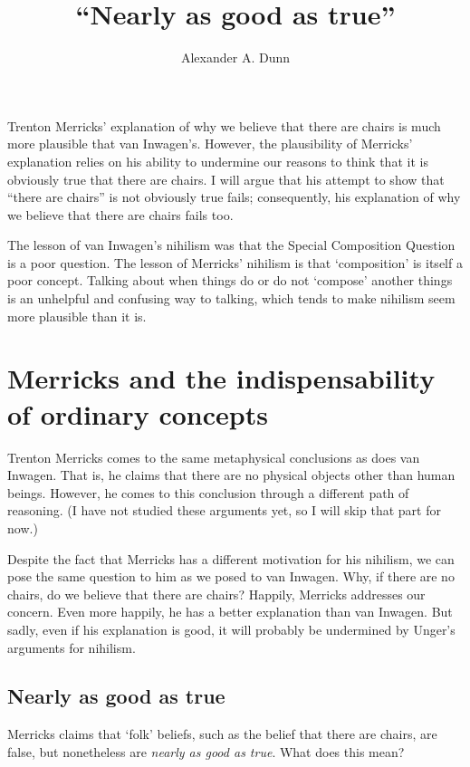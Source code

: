\documentclass[11pt]{article}
\title{``Nearly as good as true''}
\author{Alexander A. Dunn}
\begin{document}
\ifstandalone
\maketitle
\begin{spacing}{1.25}
\fi

\noindent Trenton Merricks' explanation of why we believe that there
are chairs is much more plausible that van Inwagen's.  However, the
plausibility of Merricks' explanation relies on his ability to
undermine our reasons to think that it is obviously true that there
are chairs.  I will argue that his attempt to show that ``there are
chairs'' is not obviously true fails; consequently, his explanation of
why we believe that there are chairs fails too.  

The lesson of van Inwagen's nihilism was that the Special Composition
Question is a poor question.  The lesson of Merricks' nihilism is that
`composition' is itself a poor concept.  Talking about when things do
or do not `compose' another things is an unhelpful and confusing way
to talking, which tends to make nihilism seem more plausible than it
is.

\section{Merricks and the indispensability of ordinary concepts}
\label{merricks}
Trenton Merricks comes to the same metaphysical conclusions as does
van Inwagen.  That is, he claims that there are no physical objects
other than human beings.  However, he comes to this conclusion through
a different path of reasoning.  (I have not studied these arguments
yet, so I will skip that part for now.)

Despite the fact that Merricks has a different motivation for his
nihilism, we can pose the same question to him as we posed to van
Inwagen.  Why, if there are no chairs, do we believe that there are
chairs?  Happily, Merricks addresses our concern.  Even more happily,
he has a better explanation than van Inwagen.  But sadly, even if his
explanation is good, it will probably be undermined by Unger's
arguments for nihilism.

\subsection{Nearly as good as true}
\label{near}
Merricks claims that `folk' beliefs, such as the belief that there are
chairs, are false, but nonetheless are {\em nearly as good as true}.
What does this mean?


\end{spacing}
\end{document}
